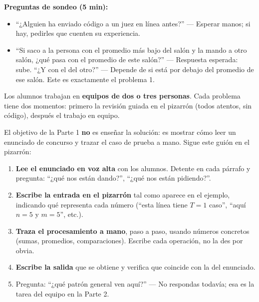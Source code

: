 \documentclass[12pt, oneside]{article}
\begin{document}
\begin{notaprofesor}
  \textbf{Preguntas de sondeo (5 min):}
  \begin{itemize}
    \item ``¿Alguien ha enviado código a un juez en línea antes?''
          — Esperar manos; si hay, pedirles que cuenten su experiencia.
    \item ``Si saco a la persona con el promedio más bajo del salón y la
          mando a otro salón, ¿qué pasa con el promedio de este salón?''
          — Respuesta esperada: sube.  ``¿Y con el del otro?''
          — Depende de si está por debajo del promedio de ese salón.
          Este es exactamente el problema 1.
  \end{itemize}
\end{notaprofesor}

Los alumnos trabajan en \textbf{equipos de dos o tres personas}.
Cada problema tiene dos momentos: primero la revisión guiada en el
pizarrón (todos atentos, sin código), después el trabajo en equipo.

\begin{notaprofesor}
  El objetivo de la Parte 1 \textbf{no} es enseñar la solución: es
  mostrar cómo leer un enunciado de concurso y trazar el caso de prueba
  a mano.  Sigue este guión en el pizarrón:
  \begin{enumerate}
    \item \textbf{Lee el enunciado en voz alta} con los alumnos.
          Detente en cada párrafo y pregunta: ``¿qué nos están dando?'',
          ``¿qué nos están pidiendo?''.
    \item \textbf{Escribe la entrada en el pizarrón} tal como aparece
          en el ejemplo, indicando qué representa cada número
          (``esta línea tiene $T=1$ caso'', ``aquí $n=5$ y $m=5$'', etc.).
    \item \textbf{Traza el procesamiento a mano}, paso a paso, usando
          números concretos (sumas, promedios, comparaciones).
          Escribe cada operación, no la des por obvia.
    \item \textbf{Escribe la salida} que se obtiene y verifica que
          coincide con la del enunciado.
    \item Pregunta: ``¿qué patrón general ven aquí?''
          — No respondas todavía; esa es la tarea del equipo en la Parte 2.
  \end{enumerate}
\end{notaprofesor}
\end{document}
